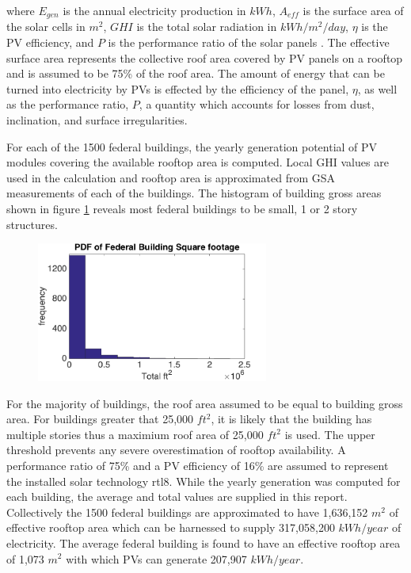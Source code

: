 where $E_{gen}$ is the annual electricity production in $kWh$, $A_{eff}$ is the surface area of the solar cells in $m^2$, $GHI$ is the total solar radiation in $kWh/m^{2}/day$, $\eta$ is the PV efficiency, and $P$ is the performance ratio of the solar panels \cite{rtl8}. The effective surface area represents the collective roof area covered by PV panels on a rooftop and is assumed to be 75\% of the roof area. The amount of energy that can be turned into electricity by PVs is effected by the efficiency of the panel, $\eta$, as well as the performance ratio, $P$, a quantity which accounts for losses from dust, inclination, and surface irregularities. 
\par
For each of the 1500 federal buildings, the yearly generation potential of PV modules covering the available rooftop area is computed.  Local GHI values are used in the calculation and rooftop area is approximated from GSA measurements of each of the buildings. The histogram of building gross areas shown in figure \ref{fig:rtl_pic1} reveals most federal buildings to be small, 1 or 2 story structures. 
\begin{figure}
  \begin{center}
    \includegraphics[width=0.68\textwidth]{pics/rtl_pic1}
  \end{center}
\label{fig:rtl_pic1}
\end{figure}

For the majority of buildings, the roof area assumed to be equal to building gross area. For buildings greater that 25,000 $ft^2$, it is likely that the building has multiple stories thus a maximium roof area of 25,000 $ft^2$ is used. The upper threshold prevents any severe overestimation of rooftop availability. A performance ratio of 75\% and a PV efficiency of 16\% are assumed to represent the installed solar technology \cite{roisin}{rtl8}. While the yearly generation was computed for each building, the average and total values are supplied in this report. Collectively the 1500 federal buildings are approximated to have 1,636,152 $m^2$ of effective rooftop area which can be harnessed to supply 317,058,200 $kWh/year$ of electricity. The average federal building is found to have an effective rooftop area of 1,073 $m^2$ with which PVs can generate 207,907 $kWh/year$.
\par 

